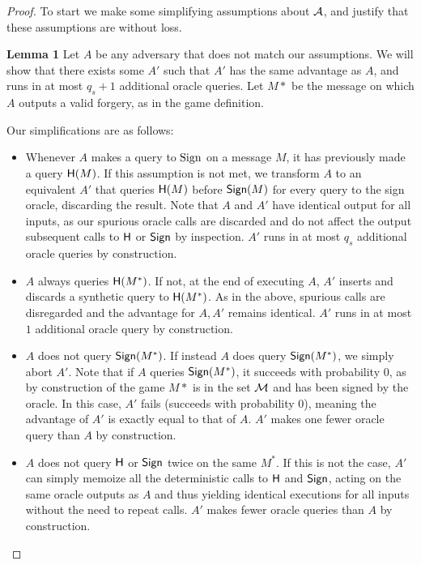 \begin{proof}
To start we make some simplifying assumptions about ${\mathcal A}$, and justify that these assumptions are without loss.

\textbf{Lemma 1} Let $A$ be any adversary that does not match our assumptions.  We will show that there exists some $A'$ such that $A'$ has the same advantage as $A$, and runs in at most $q_s+1$ additional oracle queries.  Let $M*$ be the message on which $A$ outputs a valid forgery, as in the game definition.

Our simplifications are as follows:
\begin{itemize}
	\item Whenever $A$ makes a query to $\textnormal{Sign}$ on a message $M$, it has previously made a query
$\mathsf{H}(M)$.  If this assumption is not met, we transform $A$ to an equivalent $A'$ that queries $\mathsf{H}(M)$ before $\mathsf{Sign}(M)$ for every query to the sign oracle, discarding the result.  Note that $A$ and $A'$ have identical output for all inputs, as our spurious oracle calls are discarded and do not affect the output subsequent calls to $\mathsf{H}$ or $\mathsf{Sign}$ by inspection.  $A'$ runs in at most $q_s$ additional oracle queries by construction.
	\item $A$ always queries $\mathsf{H}(M^*)$.  If not, at the end of executing $A$, $A'$ inserts and discards a synthetic query to $\mathsf{H}(M^*)$. As in the above, spurious calls are disregarded and the advantage for $A, A'$ remains identical.  $A'$ runs in at most $1$ additional oracle query by construction.
	\item $A$ does not query $\mathsf{Sign}(M^*)$.  If instead $A$ does query $\mathsf{Sign}(M^*)$, we simply abort $A'$.  Note that if $A$ queries $\mathsf{Sign}(M^*)$, it succeeds with probability $0$, as by construction of the game $M*$ is in the set ${\cal M}$ and has been signed by the oracle.  In this case, $A'$ fails (succeeds with probability $0$), meaning the advantage of $A'$ is exactly equal to that of $A$.  $A'$ makes one fewer oracle query than $A$ by construction.
	\item $A$ does not query $\mathsf{H}$ or $\mathsf{Sign}$ twice on the same $M^*$.  If this is not the case, $A'$ can simply memoize all the deterministic calls to $\mathsf{H}$ and $\mathsf{Sign}$, acting on the same oracle outputs as $A$ and thus yielding identical executions for all inputs without the need to repeat calls.  $A'$ makes fewer oracle queries than $A$ by construction.
\end{itemize}


\end{proof}
